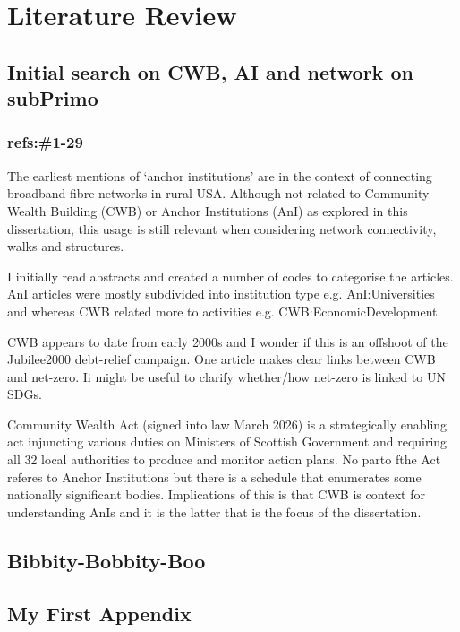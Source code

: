 \documentclass[11pt]{article}
\begin{document}

\newpage
{}

\newpage

\tableofcontents
\newpage

\setcounter{page}{1}

\section{Literature Review}


\subsection{Initial search on CWB, AI and network on subPrimo}
\subsubsection{refs:\#1-29}
The earliest mentions of `anchor institutions' are in the context of connecting broadband fibre networks in rural USA. Although not related to Community Wealth Building (CWB) or Anchor Institutions (AnI) as explored in this dissertation, this usage is still relevant when considering network connectivity, walks and structures.

I initially read abstracts and created a number of codes to categorise the articles. AnI articles were mostly subdivided into institution type e.g. AnI:Universities and whereas CWB related more to activities e.g. CWB:EconomicDevelopment.

CWB appears to date from early 2000s and I wonder if this is an offshoot of the Jubilee2000 debt-relief campaign. One article makes clear links between CWB and net-zero. Ii might be useful to clarify whether/how net-zero is linked to UN SDGs.

Community Wealth Act (signed into law March 2026) is a strategically enabling act injuncting various duties on Ministers of Scottish Government and requiring all 32 local authorities to produce and monitor action plans. No parto fthe Act referes to Anchor Institutions but there is a schedule that enumerates some nationally significant bodies.  Implications of this is that CWB is context for understanding AnIs and it is the latter that is the focus of the dissertation.

\subsection{Bibbity-Bobbity-Boo}


\newpage
\clearpage


\renewcommand{\bibname}{References}


\newpage
\begin{appendix}
	\section{My First Appendix}

	\nocite{*}

\end{appendix}
\end{document}
